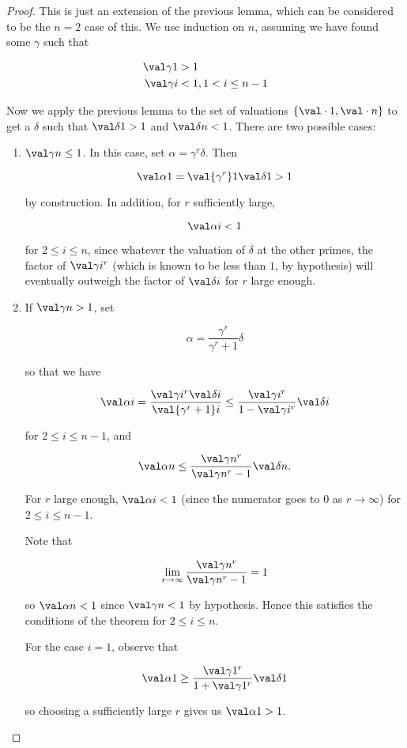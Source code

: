 \begin{proof}
  This is just an extension of the previous lemma, which can be considered to be
  the $n=2$ case of this. We use induction on $n$, assuming we have found some
  $\gamma$ such that

  \begin{align*}
    \val \gamma 1 &> 1\\
    \val \gamma i &< 1, 1 < i \leq n - 1
  \end{align*}

  Now we apply the previous lemma to the set of valuations $\{ \val \cdot 1,
  \val \cdot n \}$ to get a $\delta$ such that $\val \delta 1 > 1$ and $\val
  \delta n < 1$. There are two possible cases:
  \begin{enumerate}
  \item $\val \gamma n \leq 1$. In this case, set $\alpha = \gamma^r \delta$.
    Then

    \[ \val \alpha 1 = \val {\gamma^r} 1 \val \delta 1 > 1 \]

    by construction. In addition, for $r$ sufficiently large,

    \[ \val \alpha i < 1 \]

    for $2\leq i \leq n$, since whatever the valuation of $\delta$ at the other
    primes, the factor of $\val \gamma i ^r$ (which is known to be less than
    $1$, by hypothesis) will eventually outweigh the factor of $\val \delta i$
    for $r$ large enough.

  \item If $\val \gamma n > 1$, set

    \[ \alpha = \frac{\gamma^r}{\gamma^r + 1} \delta \]

    so that we have

    \[ \val \alpha i = \frac{\val \gamma i ^r \val \delta i}{\val {\gamma^r + 1}
        i} \leq \frac {\val \gamma i ^r} {1 - \val \gamma i ^r} \val \delta i
    \]

    for $2 \leq i \leq n - 1$, and

    \[
      \val \alpha n \leq \frac{\val \gamma n ^r} {\val \gamma n ^r - 1} \val
      \delta n.
    \]

    For $r$ large enough, $\val \alpha i < 1$ (since the numerator goes to $0$
    as $r\to\infty$) for $2\leq i\leq n-1$.

    Note that

    \[ \lim_{r\to\infty} \frac{\val \gamma n ^r} {\val \gamma n ^r - 1} = 1 \]

    so $\val \alpha n < 1$ since $\val \gamma n < 1$ by hypothesis. Hence this
    satisfies the conditions of the theorem for $2\leq i \leq n$.

    For the case $i = 1$, observe that

    \[ \val \alpha 1 \geq \frac {\val \gamma 1 ^r} {1 + \val \gamma 1 ^r} \val
      \delta 1 \]

    so choosing a sufficiently large $r$ gives us $\val \alpha 1 > 1$.

  \end{enumerate}
\end{proof}

